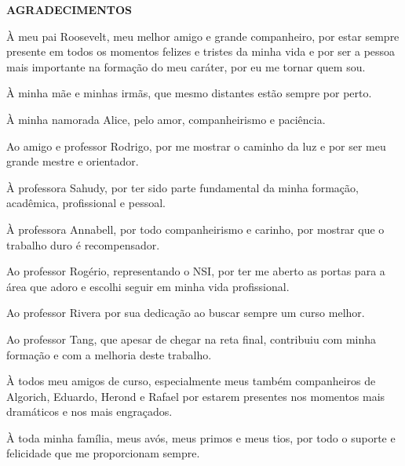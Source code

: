 \begin{center}
\textbf{AGRADECIMENTOS} \\ [2.5cm]
\end{center}

À meu pai Roosevelt, meu melhor amigo e grande companheiro, por estar sempre presente em todos os momentos felizes e tristes da minha vida e por ser a pessoa mais importante na formação do meu caráter, por eu me tornar quem sou.

À minha mãe e minhas irmãs, que mesmo distantes estão sempre por perto.

À minha namorada Alice, pelo amor, companheirismo e paciência.

Ao amigo e professor Rodrigo, por me mostrar o caminho da luz e por ser meu grande mestre e orientador.

À professora Sahudy, por ter sido parte fundamental da minha formação, acadêmica, profissional e pessoal.

À professora Annabell, por todo companheirismo e carinho, por mostrar que o trabalho duro é recompensador.

Ao professor Rogério, representando o NSI, por ter me aberto as portas para a área que adoro e escolhi seguir em minha vida profissional.

Ao professor Rivera por sua dedicação ao buscar sempre um curso melhor.

Ao professor Tang, que apesar de chegar na reta final, contribuiu com minha formação e com a melhoria deste trabalho.

À todos meu amigos de curso, especialmente meus também companheiros de Algorich, Eduardo, Herond e Rafael por estarem presentes nos momentos mais dramáticos e nos mais engraçados.

À toda minha família, meus avós, meus primos e meus tios, por todo o suporte e felicidade que me proporcionam sempre.